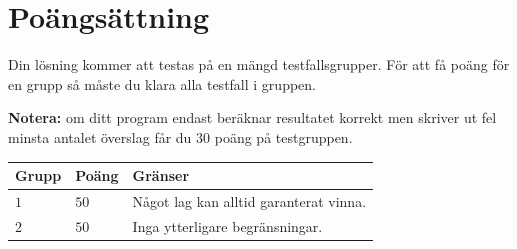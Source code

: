 \section*{Poängsättning}
Din lösning kommer att testas på en mängd testfallsgrupper.
För att få poäng för en grupp så måste du klara alla testfall i gruppen.

\textbf{Notera:} om ditt program endast beräknar resultatet korrekt men skriver ut fel minsta antalet överslag får du $30$ poäng på testgruppen.

\noindent
\begin{tabular}{| l | l | p{12cm} |}
  \hline
  \textbf{Grupp} & \textbf{Poäng} & \textbf{Gränser} \\ \hline
  $1$    & $50$        & Något lag kan alltid garanterat vinna.\\ \hline 
  $2$    & $50$        & Inga ytterligare begränsningar. \\ \hline 
\end{tabular}
